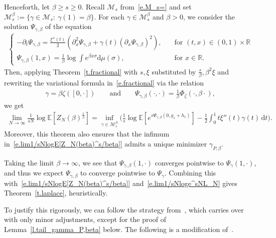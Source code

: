\documentclass[11pt]{amsart}
\theoremstyle{remark}
\theoremstyle{definition}
\numberwithin{equation}{section}
\numberwithin{proposition}{section}
\numberwithin{figure}{section}
\numberwithin{table}{section}
\newcommand{\R}{\mathbb{R}}
\newcommand{\E}{\mathbb{E}}
\renewcommand{\geq}{\geqslant}
\newcommand{\Ll}{\left}
\newcommand{\Rr}{\right}
\renewcommand{\d}{\mathrm{d}}
\newcommand{\1}{\mathbf{1}}
\newcommand{\mcl}{\mathcal}
\newcommand{\be}{\beta}
\newcommand{\ga}{\gamma}
\newcommand{\cM}{\mathcal{M}}
\begin{document}
Henceforth, let $\beta\geq s \geq 0$. Recall $\mcl M_s$ from~\eqref{e.M_s=} and set $\mcl M_s^\beta:=\{\gamma\in\mcl M_s:\: \gamma(1)=\beta\}$.
For each $\gamma\in\mcl M_s^\beta$ and $\beta>0$, we consider the solution $\Psi_{\ga,\be}$ of the equation
\begin{align}\label{e.Psi_gamma,beta}
\begin{cases}
    -\partial_t \Psi_{\ga,\be} =  \frac{\xi''(t)}{2} \Ll( \partial_{x}^2 \Psi_{\ga,\be} + \ga(t) ( \partial_x \Psi_{\ga,\be} )^2\Rr), & \quad \text{for } (t,x) \in (0,1) \times \R \\
    \Psi_{\ga,\be}(1,x) = \tfrac{1}{\beta}\log \int e^{\beta x\sigma}\d \mu(\sigma) , & \quad \text{for } x \in \R.
\end{cases}
\end{align}
Then, applying Theorem~\ref{t.fractional} with $s,\xi$ substituted by $\frac{s}{\beta},\beta^2\xi$ and rewriting the variational formula in~\eqref{e.fractional} via the relation
\begin{align}\label{e.gamma=,Psi_gamma,beta=}
    \gamma=\beta\zeta([0,\cdot])\qquad\text{and}\qquad \Psi_{\ga,\be}(\cdot,\cdot) = \frac{1}{\be}\Phi_\zeta(\cdot,\beta\cdot),
\end{align}
we get
\begin{align}\label{e.lim1/sNlogE[Z_N(beta)^s/beta]}
    \lim_{N\to\infty}\frac{1}{sN}\log \E\Ll[Z_N(\beta)^\frac{s}{\beta}\Rr] = \inf_{\gamma \in \cM_s^\beta}\bigg( \frac{1}{s}\log\E\Ll[e^{s\Psi_{\gamma,\beta}(0,g_1+h_1)}\Rr] - \frac{1}{2} \int_0^1 t \xi''(t) \gamma(t) \, \d t \bigg).
\end{align}
Moreover, this theorem also ensures that the infimum in~\eqref{e.lim1/sNlogE[Z_N(beta)^s/beta]} admits a unique minimizer $\gamma_{P,\beta}$. 


Taking the limit $\beta \to \infty$, we see that $\Psi_{\gamma,\beta}(1,\cdot)$ converges pointwise to $\Psi_\gamma(1,\cdot)$, and thus we expect $\Psi_{\gamma,\beta}$ to converge pointwise to $\Psi_\gamma$. Combining this with~\eqref{e.lim1/sNlogE[Z_N(beta)^s/beta]} and~\eqref{e.lim1/sNloge^sNL_N} gives Theorem~\ref{t.laplace}, heuristically.

To justify this rigorously, we can follow the strategy from~\cite{auffinger2017parisi}, which carries over with only minor adjustments, except for the proof of Lemma~\ref{l.tail_gamma_P,beta} below. The following is a modification of~\cite[Lemma~2]{auffinger2017parisi}.
\end{document}

